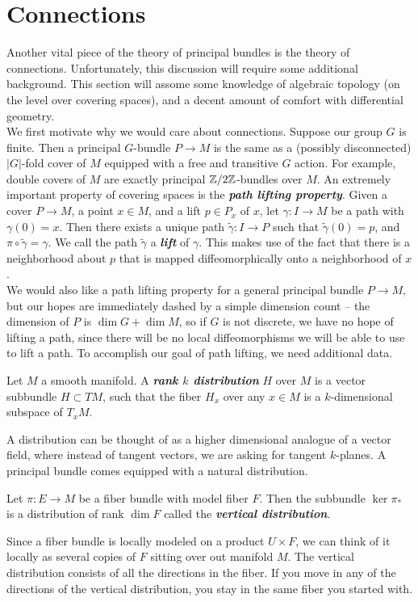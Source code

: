 \documentclass[abstract=on,twoside]{scrreprt}
\begin{document}
\section*{Connections}
%
Another vital piece of the theory of principal bundles is the theory of connections.
Unfortunately, this discussion  will require some additional background. This section
will assome some knowledge of algebraic topology (on the level over covering spaces),
and a decent amount of comfort with differential geometry. \\

We first motivate why we would care about connections. Suppose our group $G$ is finite.
Then a principal $G$-bundle $P \to M$ is the same as a (possibly disconnected)
$|G|$-fold cover of $M$ equipped with a free and transitive $G$ action. For example,
double covers of $M$ are exactly principal $\mathbb{Z}/2\mathbb{Z}$-bundles over $M$. An extremely
important property of covering spaces is the \textbf{\textit{path lifting property}}.
Given a cover $P \to M$, a point $x \in M$, and a lift $p \in P_x$ of $x$, let
$\gamma : I \to M$ be a path with $\gamma(0) = x$. Then there exists a unique
path $\widetilde{\gamma} : I \to P$ such that $\widetilde{\gamma}(0) = p$, and
$\pi \circ \widetilde{\gamma} = \gamma$. We call the path $\widetilde{\gamma}$ a
\textbf{\textit{lift}} of $\gamma$. This makes use of the fact that there is a
neighborhood about $p$ that is mapped diffeomorphically onto a neighborhood of $x$. \\

We would also like a path lifting property for a general principal bundle
$P \to M$, but our hopes are immediately dashed by a simple dimension count --
the dimension of $P$ is $\dim G + \dim M$, so if $G$ is not discrete, we have
no hope of lifting a path, since there will be no local diffeomorphisms we will be
able to use to lift a path. To accomplish our goal of path lifting, we need
additional data.
%
\begin{definition}
Let $M$ a smooth manifold. A \textbf{\textit{rank $k$ distribution}} $H$ over $M$ is
a vector subbundle $H \subset TM$, such that the fiber $H_x$ over any $x \in M$
is a $k$-dimensional subspace of $T_xM$.
\end{definition}
%
A distribution can be thought of as a higher dimensional analogue of a vector field,
where instead of tangent vectors, we are asking for tangent $k$-planes. A
principal bundle comes equipped with a natural distribution.
%
\begin{definition}
Let $\pi : E \to M$ be a fiber bundle with model fiber $F$.
Then the subbundle $\ker\pi_*$ is a distribution of rank $\dim F$ called the
\textbf{\textit{vertical distribution}}.
\end{definition}
%
Since a fiber bundle is locally modeled on a product $U \times F$, we can
think of it locally as several copies of $F$ sitting over out manifold $M$. The
vertical distribution consists of all the directions in the fiber. If you move in
any of the directions of the vertical distribution, you stay in the same fiber
you started with.
\end{document}
